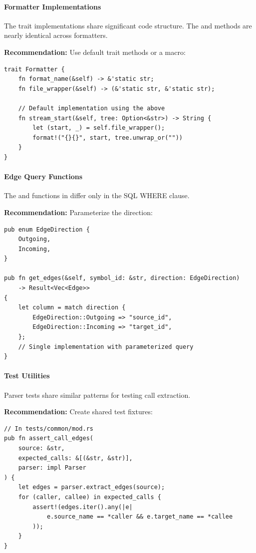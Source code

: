 \paragraph{Formatter Implementations}
The  trait implementations share significant code structure. The  and  methods are nearly identical across formatters.

\textbf{Recommendation:} Use default trait methods or a macro:

\begin{lstlisting}[style=rustcode, caption={Default trait implementation}]
trait Formatter {
    fn format_name(&self) -> &'static str;
    fn file_wrapper(&self) -> (&'static str, &'static str);
    
    // Default implementation using the above
    fn stream_start(&self, tree: Option<&str>) -> String {
        let (start, _) = self.file_wrapper();
        format!("{}{}", start, tree.unwrap_or(""))
    }
}
\end{lstlisting}

\paragraph{Edge Query Functions}
The  and  functions in  differ only in the SQL WHERE clause.

\textbf{Recommendation:} Parameterize the direction:

\begin{lstlisting}[style=rustcode, caption={Unified edge query function}]
pub enum EdgeDirection {
    Outgoing,
    Incoming,
}

pub fn get_edges(&self, symbol_id: &str, direction: EdgeDirection) 
    -> Result<Vec<Edge>> 
{
    let column = match direction {
        EdgeDirection::Outgoing => "source_id",
        EdgeDirection::Incoming => "target_id",
    };
    // Single implementation with parameterized query
}
\end{lstlisting}

\paragraph{Test Utilities}
Parser tests share similar patterns for testing call extraction.

\textbf{Recommendation:} Create shared test fixtures:

\begin{lstlisting}[style=rustcode, caption={Shared test fixture}]
// In tests/common/mod.rs
pub fn assert_call_edges(
    source: &str, 
    expected_calls: &[(&str, &str)],
    parser: impl Parser
) {
    let edges = parser.extract_edges(source);
    for (caller, callee) in expected_calls {
        assert!(edges.iter().any(|e| 
            e.source_name == *caller && e.target_name == *callee
        ));
    }
}
\end{lstlisting}

